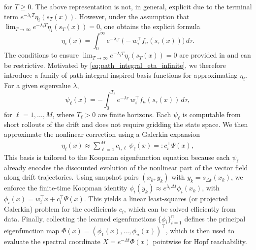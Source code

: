\documentclass[letterpaper, 10 pt, conference]{ieeeconf}
\theoremstyle{plain}
\theoremstyle{definition}
\begin{document}
for $ T\ge 0$. 
The above representation is not, in general, explicit due to the terminal term
\(e^{-\lambda_i T}\eta_i(s_T(x))\). However, under the assumption that
\(\lim_{T\to \infty} e^{-\lambda_i T}\eta_i(s_T(x))=0\), one obtains the explicit formula
\begin{equation}\label{eq:path_integral_eta_infinite}
    \eta_i(x)
    =
    \int_{0}^{\infty} e^{-\lambda_i \tau}\, \big(-w_i^\top f_n(s_\tau(x))\big)\, d\tau.
\end{equation}
The conditions to ensure \(\lim_{T\to \infty} e^{-\lambda_i T}\eta_i(s_T(x))=0\) are provided in \cite{deka2023path} and can be restrictive.
Motivated by \eqref{eq:path_integral_eta_infinite}, we therefore introduce a family of
path-integral inspired basis functions for approximating \(\eta_i\).
For a given eigenvalue \(\lambda\), 
\begin{equation}\label{eq:path_integral_basis}
    \psi_\ell(x)
    =
    -\int_{0}^{T_\ell} e^{-\lambda \tau}\, w_i^\top f_n(s_\tau(x))\, d\tau,
\end{equation}
for $\ell=1,\ldots,M$, where \(T_\ell>0\) are finite horizons. Each \(\psi_\ell\) is computable from short rollouts
of the drift and does not require gridding the state space.
We then approximate the nonlinear correction using a Galerkin expansion
\begin{align}\label{eq:eta_galerkin}
    \eta_i(x)\approx \sum_{\ell=1}^{M} c_{i,\ell}\, \psi_{\ell}(x)
    =: c_i^\top \Psi(x),
\end{align}
This basis is tailored to the Koopman eigenfunction equation because each \(\psi_\ell\) already encodes
the discounted evolution of the nonlinear part of the vector field along drift trajectories. 
Using snapshot pairs \((x_k,y_k)\) with \(y_k=s_{\Delta t}(x_k)\),
we enforce the finite-time Koopman identity $\phi_i(y_k)\approx e^{\lambda_i \Delta t}\phi_i(x_k)$, with \(\phi_i(x)=w_i^\top x+c_i^\top \Psi(x)\).
This yields a linear least-squares (or projected Galerkin) problem for the coefficients \(c_i\),
which can be solved efficiently from data. Finally, collecting the learned eigenfunctions \(\{\phi_i\}_{i=1}^n\) defines the principal eigenfunction map
\(\Phi(x)=(\phi_1(x),\dots,\phi_n(x))^\top\), which is then used to evaluate the spectral coordinate
\(X=e^{-\Lambda t}\Phi(x)\) pointwise for Hopf reachability.

\end{document}
